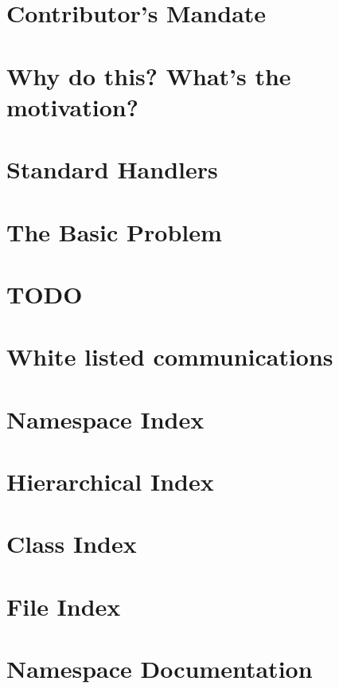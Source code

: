\documentclass[twoside]{book}
\begin{document}
\chapter{Contributor's Mandate}
\label{md_mandate}
\hypertarget{md_mandate}{}

\chapter{Why do this? What's the motivation?}
\label{md_motivation}
\hypertarget{md_motivation}{}

\chapter{Standard Handlers}
\label{md_standard_handlers}
\hypertarget{md_standard_handlers}{}

\chapter{The Basic Problem}
\label{md_the_basic_problem}
\hypertarget{md_the_basic_problem}{}

\chapter{T\-O\-D\-O}
\label{md_todo}
\hypertarget{md_todo}{}

\chapter{White listed communications}
\label{md_white_listed_communications}
\hypertarget{md_white_listed_communications}{}

\chapter{Namespace Index}

\chapter{Hierarchical Index}

\chapter{Class Index}

\chapter{File Index}

\chapter{Namespace Documentation}



\end{document}
